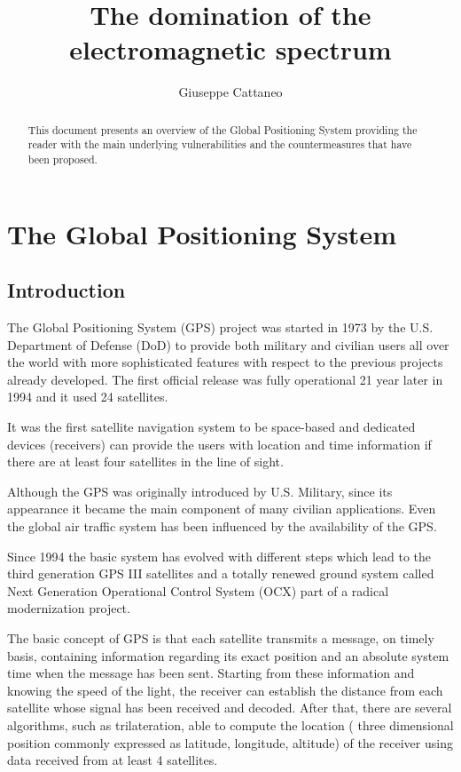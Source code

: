 \documentclass[PhD,binding=0.6cm]{dithesis}
\title{The domination of the electromagnetic spectrum}
\author{Giuseppe Cattaneo}%
\begin{document}

\maketitle

\begin{abstract}
This document presents an overview of the Global Positioning System providing the reader with the
main underlying vulnerabilities and the countermeasures that have been proposed.
\end{abstract}

\tableofcontents

\mainmatter

\chapter{The Global Positioning System}


\section{Introduction}

The Global Positioning System (GPS) project was started in 1973 by the U.S. Department of Defense (DoD) to provide both military and civilian users all over the world with more sophisticated features with respect to the previous projects already developed.
The first official release was fully operational 21 year later in 1994 and it used 24 satellites.

It was the first satellite navigation system to be space-based and dedicated devices (receivers) can provide the users with  location and time information if there are  at least four satellites in the line of sight.

Although the GPS was originally introduced by U.S. Military, since its appearance it became the main component of many civilian applications. Even the global air traffic system has been influenced by the availability of the GPS.

Since 1994 the basic system has evolved with different steps which lead to the third generation GPS III satellites and a totally renewed ground system called Next Generation Operational Control System (OCX) part of a radical modernization project.

The basic concept of GPS is that each satellite transmits a message, on timely basis, containing information regarding its exact position and an absolute system time when the message has been sent.  Starting from these information and knowing the speed of the light, the receiver can establish the distance from each satellite whose signal has been received and decoded. After that, there are several algorithms, such as trilateration, able to compute the location ( three dimensional position commonly expressed as latitude, longitude, altitude)  of the receiver using data received from at least 4 satellites.
\end{document}
